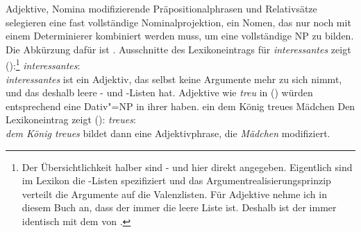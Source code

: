 Adjektive, Nomina modifizierende Präpositionalphrasen und Relativsätze
selegieren eine fast vollständige Nominalprojektion, \dash ein Nomen, das
nur noch mit einem Determinierer kombiniert werden muss, um eine vollständige
NP zu bilden. Die Abkürzung dafür ist \nbar. Ausschnitte des Lexikoneintrags für
\emph{interessantes} zeigt ():\footnote{
Der Übersichtlichkeit halber sind \spr- und \compsw hier direkt angegeben. Eigentlich sind im
Lexikon die \argst-Listen spezifiziert und das Argumentrealisierungsprinzip verteilt die Argumente
auf die Valenzlisten. Für Adjektive nehme ich in diesem Buch an, dass der \sprw immer die leere
Liste ist. Deshalb ist der \compsw immer identisch mit dem von \argst.
}
\eas{}%
\label{le-interessantes}%
\emph{interessantes}:\\
\zs
\emph{interessantes} ist ein Adjektiv, das selbst keine Argumente mehr zu sich nimmt,
und das deshalb leere \spr- und \comps-Listen hat. Adjektive wie \emph{treu} in () würden entsprechend
eine Dativ"=NP in ihrer \compsl haben.
\ea
ein dem König treues Mädchen
\z
Den Lexikoneintrag zeigt ():
\ea
\label{le-treue}
\emph{treues}:\\
\z
\emph{dem König treues} bildet dann eine Adjektivphrase, die \emph{Mädchen} modifiziert.

